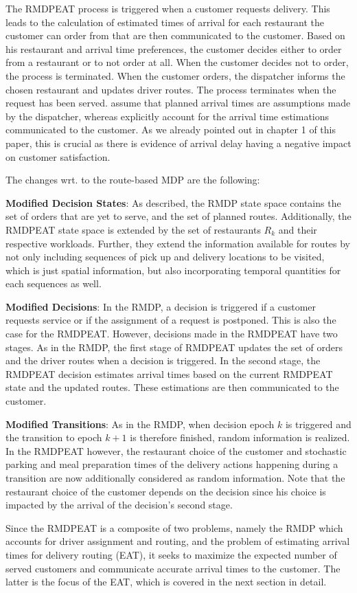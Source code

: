 The RMDPEAT process is triggered when a customer requests delivery. This leads to the calculation of estimated times of arrival for each restaurant the customer can order from that are then communicated to the customer. Based on his restaurant and arrival time preferences, the customer decides either to order from a restaurant or to not order at all. When the customer decides not to order, the process is terminated. When the customer orders, the dispatcher informs the chosen restaurant and updates driver routes. The process terminates when the request has been served. 
\cite{UlmerRMDP} assume that planned arrival times are assumptions made by the dispatcher, whereas \cite{Hildebrandt2020_EAT} explicitly account for the arrival time estimations communicated to the customer. As we already pointed out in chapter 1 of this paper, this is crucial as there is evidence of arrival delay having a negative impact on customer satisfaction.

The changes wrt. to the route-based MDP are the following:
\begin{description}[font=$\bullet$\scshape\bfseries]
	\item \textbf{Modified Decision States}: As described, the RMDP state space contains the set of orders that are yet to serve, and the set of planned routes. Additionally, the RMDPEAT state space is extended by the set of restaurants $ R_k $ and their respective workloads. Further, they extend the information available for routes by not only including sequences of pick up and delivery locations to be visited, which is just spatial information, but also incorporating temporal quantities for each sequences as well. 
	\item \textbf{Modified Decisions}: 
	In the RMDP, a decision is triggered if a customer requests service or if the assignment of a request is postponed. This is also the case for the RMDPEAT. However, decisions made in the RMDPEAT have two stages. As in the RMDP, the first stage of RMDPEAT updates the set of orders and the driver routes when a decision is triggered. In the second stage, the RMDPEAT decision estimates arrival times based on the current RMDPEAT state and the updated routes. These estimations are then communicated to the customer.  
	\item \textbf{Modified Transitions}: As in the RMDP, when decision epoch $ k $ is triggered and the transition to epoch $ k+1 $ is therefore finished, random information is realized. In the RMDPEAT however, the restaurant choice of the customer and stochastic parking and meal preparation times of the delivery actions happening during a transition are now additionally considered as random information. Note that the restaurant choice of the customer depends on the decision since his choice is impacted by the arrival of the decision's second stage.
\end{description}
Since the RMDPEAT is a composite of two problems, namely the RMDP which accounts for driver assignment and routing, and the problem of estimating arrival times for delivery routing (EAT), it seeks to maximize the expected number of served customers and communicate accurate arrival times to the customer. The latter is the focus of the EAT, which is covered in the next section in detail.

